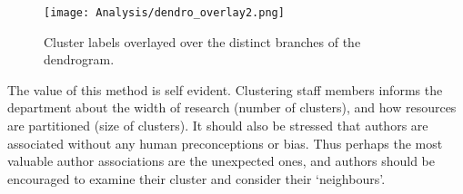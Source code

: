 \begin{center}
\begin{figure}[H]
  \centering
    \texttt{[image: Analysis/dendro\_overlay2.png]}
    \caption{Cluster labels overlayed over the distinct branches of the dendrogram.}
    \label{fig:LABELLEDDENDRO}

\end{figure} 
\end{center}
The value of this method is self evident. Clustering staff members informs the department about the width of research (number of clusters), and how resources are partitioned (size of clusters). It should also be stressed that authors are associated without any human preconceptions or bias. Thus perhaps the most valuable author associations are the unexpected ones, and authors should be encouraged to examine their cluster and consider their `neighbours'.
